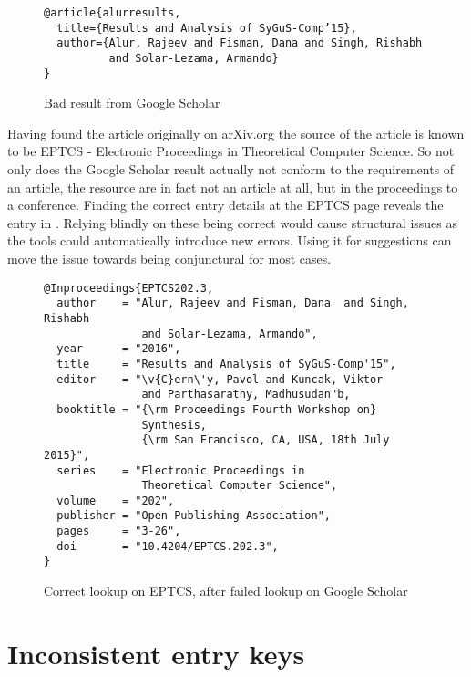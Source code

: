 \begin{figure}
  \centering
\begin{verbatim}
@article{alurresults,
  title={Results and Analysis of SyGuS-Comp’15},
  author={Alur, Rajeev and Fisman, Dana and Singh, Rishabh
          and Solar-Lezama, Armando}
}
\end{verbatim}
  \caption{Bad result from Google Scholar}
\label{fig:scholar_bad_result}
\end{figure}

Having found the article originally on arXiv.org the source of the
article is known to be EPTCS - Electronic Proceedings in Theoretical
Computer Science.  So not only does the Google Scholar result actually
not conform to the requirements of an article, the resource are in
fact not an article at all, but in the proceedings to a conference.
Finding the correct entry details at the EPTCS page reveals the entry
in .  Relying blindly on these being
correct would cause structural issues as the tools could automatically
introduce new errors.  Using it for suggestions can move the issue
towards being conjunctural for most cases.

\begin{figure}
  \centering
\begin{small}
\begin{verbatim}
@Inproceedings{EPTCS202.3,
  author    = "Alur, Rajeev and Fisman, Dana  and Singh, Rishabh 
               and Solar-Lezama, Armando",
  year      = "2016",
  title     = "Results and Analysis of SyGuS-Comp'15",
  editor    = "\v{C}ern\'y, Pavol and Kuncak, Viktor 
               and Parthasarathy, Madhusudan"b,
  booktitle = "{\rm Proceedings Fourth Workshop on}
               Synthesis,
               {\rm San Francisco, CA, USA, 18th July 2015}",
  series    = "Electronic Proceedings in 
               Theoretical Computer Science",
  volume    = "202",
  publisher = "Open Publishing Association",
  pages     = "3-26",
  doi       = "10.4204/EPTCS.202.3",
}
\end{verbatim}
\end{small}
  \caption{Correct lookup on EPTCS, after failed lookup on Google Scholar}
\label{fig:eptcs_lookup}
\end{figure}


\section{Inconsistent entry keys}
\label{sec:problems_inconsistent_keys}


